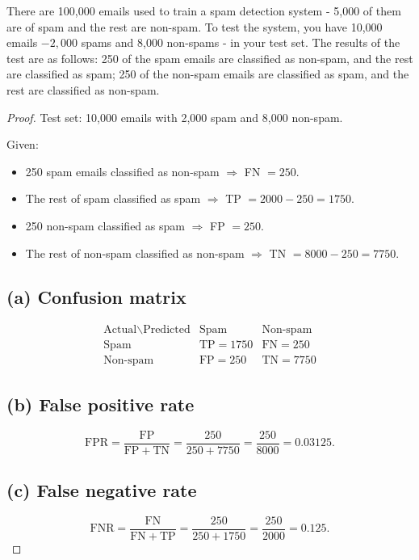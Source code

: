 \documentclass[en,hazy,blue,12pt,normal]{elegantnote}
\begin{document}
\begin{homework}
     There are 100,000 emails used to train a spam detection system - 5,000 of them are of spam and the rest are non-spam. To test the system, you have 10,000 emails $-2,000$ spams and 8,000 non-spams - in your test set.
The results of the test are as follows: 250 of the spam emails are classified as non-spam, and the rest are classified as spam; 250 of the non-spam emails are classified as spam, and the rest are classified as non-spam.
\end{homework}

\begin{proof}
    Test set: 10{,}000 emails with 2{,}000 spam and 8{,}000 non-spam.

Given:
\begin{itemize}
\item 250 spam emails classified as non-spam $\Rightarrow$ FN $=250$.
\item The rest of spam classified as spam $\Rightarrow$ TP $=2000-250=1750$.
\item 250 non-spam classified as spam $\Rightarrow$ FP $=250$.
\item The rest of non-spam classified as non-spam $\Rightarrow$ TN $=8000-250=7750$.
\end{itemize}

\subsection*{(a) Confusion matrix}
\[
\begin{array}{c|cc}
\text{Actual}\backslash \text{Predicted} & \text{Spam} & \text{Non-spam}\\
\hline
\text{Spam} & \text{TP}=1750 & \text{FN}=250\\
\text{Non-spam} & \text{FP}=250 & \text{TN}=7750
\end{array}
\]

\subsection*{(b) False positive rate}
\[
\mathrm{FPR} = \frac{\mathrm{FP}}{\mathrm{FP}+\mathrm{TN}}
= \frac{250}{250+7750}
= \frac{250}{8000}
= 0.03125.
\]

\subsection*{(c) False negative rate}
\[
\mathrm{FNR} = \frac{\mathrm{FN}}{\mathrm{FN}+\mathrm{TP}}
= \frac{250}{250+1750}
= \frac{250}{2000}
= 0.125.
\]


\end{proof}
\end{document}
